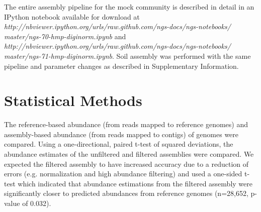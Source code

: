 \documentclass{nature}%
\begin{document}
The entire assembly pipeline for the mock community is described in
detail in an IPython notebook available for download at 
\emph{http://nbviewer.ipython.org/urls/raw.github.com/ngs-docs/ngs-notebooks/
master/ngs-70-hmp-diginorm.ipynb}
and 
\emph{http://nbviewer.ipython.org/urls/raw.github.com/ngs-docs/ngs-notebooks/
master/ngs-71-hmp-diginorm.ipynb}.  Soil assembly was performed with
the same pipeline and parameter changes as described in Supplementary Information.

\section*{Statistical Methods}
The reference-based abundance (from reads mapped to reference genomes)
and assembly-based abundance (from reads mapped to contigs) of genomes
were compared.  Using a one-directional, paired t-test of squared
deviations, the abundance estimates of the unfiltered and filtered
assemblies were compared.  We expected the filtered assembly to have
increased accuracy due to a reduction of errors (e.g. normalization
and high abundance filtering) and used a one-sided t-test which
indicated that abundance estimations from the filtered assembly were
significantly closer to predicted abundances from reference genomes
(n=28,652, p-value of 0.032).

\newpage


\end{document}
